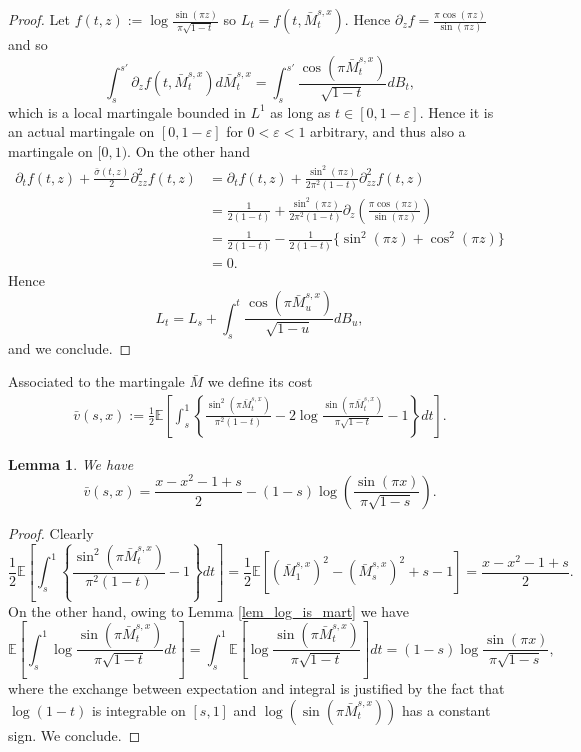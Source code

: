 \documentclass[reqno, a4paper]{amsart}
\newtheorem{lemma}[theorem]{Lemma}
\theoremstyle{remark}
\newcommand{\1}{\mathbbm 1}
\renewcommand{\epsilon}{\varepsilon}
\numberwithin{equation}{section}
\numberwithin{theorem}{section}
\newcommand{\mo}{\bar{M}}
\newcommand{\vo}{\bar{v}}
\newcommand{\so}{\bar{\sigma}}
\begin{document}
\begin{proof}
	Let $f(t,z):= \log\frac{\sin(\pi z)}{\pi\sqrt{1-t}} $ so $L_t=f(t,\mo^{s,x}_t)$. Hence $\partial_z f = \frac{\pi \cos(\pi z)}{\sin(\pi z)} $ and so
	\[\int_s^{s'} \partial_z f(t, \mo^{s,x}_t)d \mo^{s,x}_t = \int_s^{s'} \frac{\cos(\pi \mo^{s,x}_t)}{\sqrt{1-t}}dB_t,\]
	which is a local martingale bounded in $L^1$ as long as $t\in[0,1-\epsilon]$. Hence it is an actual martingale on $[0,1-\epsilon]$ for $0<\epsilon<1$ arbitrary, and thus also a martingale on $[0,1)$. On the other hand
	\begin{align*}
	\partial_tf(t,z)+\frac{\so(t,z)}{2}\partial^2_{zz}f(t,z)&=	\partial_tf(t,z)+\frac{\sin^2(\pi z)}{2\pi^2(1-t)}\partial^2_{zz}f(t,z)\\ &=\frac{1}{2(1-t)}+\frac{\sin^2(\pi z)}{2\pi^2(1-t)}\partial_{z}\left(\frac{\pi\cos(\pi z)}{\sin(\pi z)}\right)\\
		&= \frac{1}{2(1-t)} - \frac{1}{2(1-t)}\{\sin^2(\pi z)+\cos^2(\pi z)\} \\
		& = 0. 
	\end{align*}
	Hence \[L_t=L_s + \int_s^{t} \frac{\cos(\pi \mo^{s,x}_u)}{\sqrt{1-u}}dB_u,\]
	and we conclude.
\end{proof}

Associated to the martingale $\mo$ we define its cost
%
\begin{align}\label{eq:def_v}
\vo(s,x):=\frac{1}{2}\mathbb E\left[\int_s^1 \left \{\frac{\sin^2(\pi\mo^{s,x}_t)}{\pi^2(1-t)}- 2 \log\frac{\sin(\pi\mo^{s,x}_t)}{\pi\sqrt{1-t}} -1\right \} dt  \right ].
\end{align}


\begin{lemma}\label{lem_formula_v}
We have $$\vo(s,x)= \frac{x-x^2-1+s}{2}-(1-s)\log\left(\frac{\sin(\pi x)}{\pi\sqrt{1-s}} \right ).$$	
\end{lemma}

\begin{proof}
	Clearly
	\[\frac{1}{2}\mathbb E\left[\int_s^1 \left \{\frac{\sin^2(\pi\mo^{s,x}_t)}{\pi^2(1-t)}-1\right \} dt  \right ]=\frac{1}{2}\mathbb E[(\mo^{s,x}_1)^2-(\mo^{s,x}_s)^2 +s-1]=\frac{x-x^2-1+s}{2}.  \]
	On the other hand, owing to Lemma \ref{lem_log_is_mart} we have
	\[ \mathbb E\left[\int_s^1  \log\frac{\sin(\pi\mo^{s,x}_t)}{\pi\sqrt{1-t}} dt  \right ]  = \int_s^1 \mathbb E\left[ \log\frac{\sin(\pi\mo^{s,x}_t)}{\pi\sqrt{1-t}}\right ] dt  = (1-s)\log\frac{\sin(\pi x)}{\pi\sqrt{1-s}},\]
	where the exchange between expectation and integral is justified by the fact that $\log(1-t)$ is integrable on $[s,1]$ and $\log (\sin(\pi \mo^{s,x}_t))$ has a constant sign.
	We conclude.
\end{proof}
\end{document}
